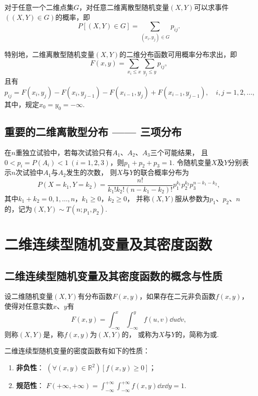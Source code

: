\begin{theorem}
对于任意一个二维点集\(G\)，对任意二维离散型随机变量\((X,Y)\)可以求事件\(((X,Y) \in G)\)的概率，即\[
P\left[(X,Y) \in G\right] = \sum_{(x_i,y_j) \in G} p_{ij}.
\]

特别地，二维离散型随机变量\((X,Y)\)的二维分布函数可用概率分布求出，即\[
F(x,y) = \sum_{x_i \leq x}\sum_{y_j \leq y} p_{ij},
\]且有\[
p_{ij} = F(x_i,y_j) - F(x_i,y_{j-1}) - F(x_{i-1},y_j) + F(x_{i-1},y_{j-1}), \quad i,j = 1,2,\dotsc,
\]其中，规定\(x_0 = y_0 = -\infty\).
\end{theorem}

\subsection{重要的二维离散型分布 —— 三项分布}
\begin{definition}
在\(n\)重独立试验中，若每次试验只有\(A_1\)、\(A_2\)、\(A_3\)三个可能结果，
且\(0 < p_i = P(A_i) < 1\ (i=1,2,3)\)，则\(p_1 + p_2 + p_3 = 1\).
令随机变量\(X\)及\(Y\)分别表示\(n\)次试验中\(A_1\)与\(A_2\)发生的次数，
则\(X\)与\(Y\)的联合概率分布为\[
P(X=k_1,Y=k_2) = \frac{n!}{k_1! k_2! (n-k_1-k_2)!} p_1^{k_1} p_2^{k_2} p_3^{n-k_1-k_2},
\]其中\(k_1+k_2 = 0,1,\dotsc,n\)，\(k_1 \geq 0\)，\(k_2 \geq 0\)，
并称\((X,Y)\)服从参数为\(p _1\)、\(p_2\)、\(n\)的，记为\((X,Y) \sim T(n;p_1,p_2)\).
\end{definition}

\section{二维连续型随机变量及其密度函数}

\subsection{二维连续型随机变量及其密度函数的概念与性质}

\begin{definition}
设二维随机变量\((X,Y)\)有分布函数\(F(x,y)\)，如果存在二元非负函数\(f(x,y)\)，使得对任意实数\(x\)、\(y\)有\[
F(x,y) = \int_{-\infty}^x \int_{-\infty}^y f(u,v) \dd{u} \dd{v},
\]则称\((X,Y)\)是，称\(f(x,y)\)为\((X,Y)\)的，
或称为\(X\)与\(Y\)的，简称为或.
\end{definition}

\begin{property}
二维连续型随机变量的密度函数有如下的性质：
\begin{enumerate}
	\item {\bf 非负性}：
	\((\forall (x,y)\in\mathbb{R}^2)[f(x,y) \geq 0]\)；

	\item {\bf 规范性}：
	\(F(+\infty,+\infty) = \int_{-\infty}^{+\infty} \int_{-\infty}^{+\infty} f(x,y) \dd{x} \dd{y} = 1\).
\end{enumerate}
\end{property}

